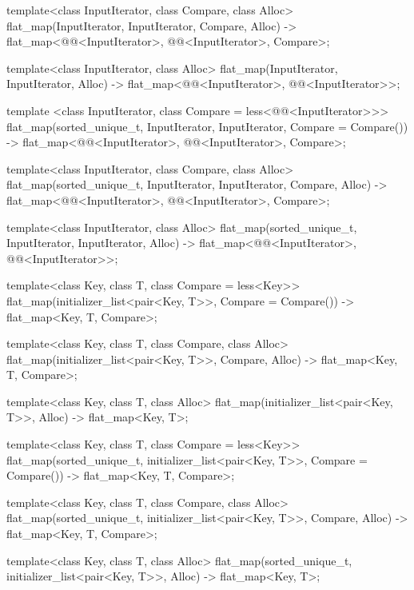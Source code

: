 \begin{codeblock}
\begin{codeblock}
\begin{codeblock}
\begin{addedblock}
\begin{codeblock}
{  template<class InputIterator, class Compare, class Alloc>
    flat_map(InputIterator, InputIterator, Compare, Alloc)
      -> flat_map<@@<InputIterator>, @@<InputIterator>, Compare>;

  template<class InputIterator, class Alloc>
    flat_map(InputIterator, InputIterator, Alloc)
      -> flat_map<@@<InputIterator>, @@<InputIterator>>;

  template <class InputIterator, class Compare = less<@@<InputIterator>>>
    flat_map(sorted_unique_t, InputIterator, InputIterator, Compare = Compare())
      -> flat_map<@@<InputIterator>, @@<InputIterator>, Compare>;

  template<class InputIterator, class Compare, class Alloc>
    flat_map(sorted_unique_t, InputIterator, InputIterator, Compare, Alloc)
      -> flat_map<@@<InputIterator>, @@<InputIterator>, Compare>;

  template<class InputIterator, class Alloc>
    flat_map(sorted_unique_t, InputIterator, InputIterator, Alloc)
      -> flat_map<@@<InputIterator>, @@<InputIterator>>;

  template<class Key, class T, class Compare = less<Key>>
    flat_map(initializer_list<pair<Key, T>>, Compare = Compare())
      -> flat_map<Key, T, Compare>;

  template<class Key, class T, class Compare, class Alloc>
    flat_map(initializer_list<pair<Key, T>>, Compare, Alloc)
      -> flat_map<Key, T, Compare>;

  template<class Key, class T, class Alloc>
    flat_map(initializer_list<pair<Key, T>>, Alloc)
      -> flat_map<Key, T>;

  template<class Key, class T, class Compare = less<Key>>
  flat_map(sorted_unique_t, initializer_list<pair<Key, T>>, Compare = Compare())
      -> flat_map<Key, T, Compare>;

  template<class Key, class T, class Compare, class Alloc>
    flat_map(sorted_unique_t, initializer_list<pair<Key, T>>, Compare, Alloc)
      -> flat_map<Key, T, Compare>;

  template<class Key, class T, class Alloc>
    flat_map(sorted_unique_t, initializer_list<pair<Key, T>>, Alloc)
      -> flat_map<Key, T>;
}
\end{codeblock}


\end{addedblock}
\end{codeblock}
\end{codeblock}
\end{codeblock}
